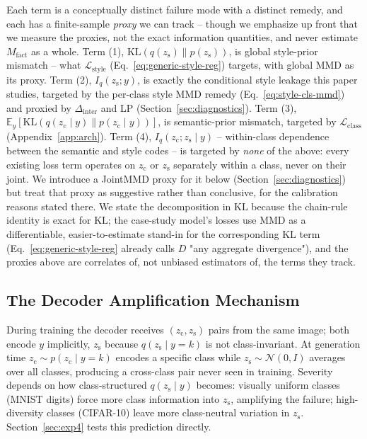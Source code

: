 \documentclass[10pt,letterpaper]{article}
\newcommand{\zc}{z_{\mathrm{c}}}
\newcommand{\zs}{z_{\mathrm{s}}}
\newcommand{\KL}{\mathrm{KL}}
\begin{document}
Each term is a conceptually distinct failure mode with a distinct remedy,
and each has a finite-sample \emph{proxy} we can track -- though we
emphasize up front that we measure the proxies, not the exact information
quantities, and never estimate $M_{\mathrm{fact}}$ as a whole. Term (1),
$\KL(q(\zs)\|p(\zs))$, is global style-prior mismatch -- what
$\mathcal L_{\mathrm{style}}$ (Eq.~\ref{eq:generic-style-reg}) targets, with
global MMD as its proxy. Term (2), $I_q(\zs;y)$, is exactly the conditional
style leakage this paper studies, targeted by the per-class style MMD remedy
(Eq.~\ref{eq:style-cls-mmd}) and proxied by $\Delta_{\mathrm{inter}}$ and LP
(Section~\ref{sec:diagnostics}). Term (3),
$\mathbb E_y[\KL(q(\zc\mid y)\|p(\zc\mid y))]$, is semantic-prior mismatch,
targeted by $\mathcal L_{\mathrm{class}}$ (Appendix~\ref{app:arch}). Term
(4), $I_q(\zc;\zs\mid y)$ -- within-class dependence between the semantic
and style codes -- is targeted by \emph{none} of the above: every existing
loss term operates on $\zc$ or $\zs$ separately within a class, never on
their joint. We introduce a JointMMD proxy for it below
(Section~\ref{sec:diagnostics}) but treat that proxy as suggestive rather
than conclusive, for the calibration reasons stated there. We state the
decomposition in $\KL$ because the chain-rule identity is exact for $\KL$;
the case-study model's losses use MMD as a differentiable, easier-to-estimate
stand-in for the corresponding $\KL$ term (Eq.~\ref{eq:generic-style-reg}
already calls $D$ "any aggregate divergence"), and the proxies above are
correlates of, not unbiased estimators of, the terms they track.

\subsection{The Decoder Amplification Mechanism}
\label{sec:mechanism}

During training the decoder receives $(\zc,\zs)$ pairs from the same image;
both encode $y$ implicitly, $\zs$ because $q(\zs\mid y{=}k)$ is not
class-invariant. At generation time $\zc\sim p(\zc\mid y{=}k)$ encodes a
specific class while $\zs\sim\mathcal{N}(0,I)$ averages over all classes,
producing a cross-class pair never seen in training. Severity depends on how
class-structured $q(\zs\mid y)$ becomes: visually uniform classes (MNIST
digits) force more class information into $\zs$, amplifying the failure;
high-diversity classes (CIFAR-10) leave more class-neutral variation in
$\zs$. Section~\ref{sec:exp4} tests this prediction directly.
\end{document}
